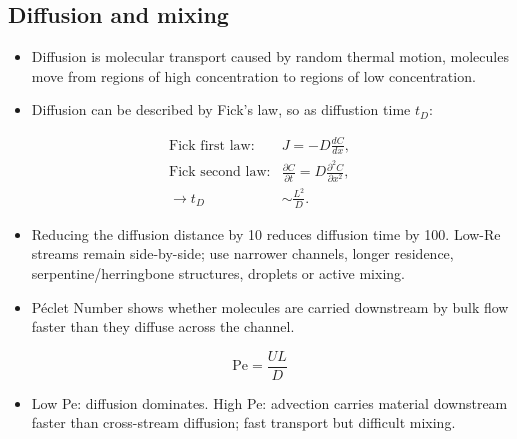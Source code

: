 \documentclass[10pt,a4paper]{ctexart}
\newcommand{\formula}[1]{%
	\par\vspace{1pt}\begingroup
	\setlength{\abovedisplayskip}{0pt}\setlength{\belowdisplayskip}{0pt}
	\[ #1 \]\endgroup\vspace{1pt}}
\begin{document}
\begin{multicols*}{2}
\subsection{Diffusion and mixing}
\begin{itemize}
	\item Diffusion is molecular transport caused by random thermal motion, 
	molecules move from regions of high concentration to regions of low concentration.
	\item Diffusion can be described by Fick's law, so as diffustion time $t_D$:
\end{itemize}
\formula{\begin{aligned}
\text{Fick first law:} & J=-D\frac{dC}{dx},\\
\text{Fick second law:} & \frac{\partial C}{\partial t}=D\frac{\partial^2C}{\partial x^2},\\
\rightarrow t_D&\sim\frac{L^2}{D}.
\end{aligned}}
\begin{itemize}
	\item Reducing the diffusion distance by 10 reduces diffusion time by 100. Low-Re streams remain side-by-side; 
	use narrower channels, longer residence, serpentine/herringbone structures, droplets or active mixing.
	\item Péclet Number shows whether molecules are carried downstream by bulk flow faster than they diffuse across the channel.
\end{itemize}
\formula{\mathrm{Pe}=\frac{UL}{D}}
\begin{itemize}
	\item Low Pe: diffusion dominates. High Pe: advection carries material downstream faster than cross-stream diffusion; 
	fast transport but difficult mixing.
\end{itemize}


\end{multicols*}
\end{document}
